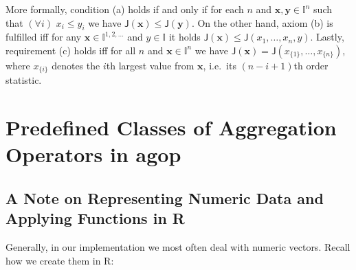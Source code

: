 \documentclass[11pt]{article}\usepackage{graphicx, color}
\newcommand{\package}[1]{\textsf{#1}\xspace}
\newcommand{\lang}[1]{\textsf{#1}\xspace}
\newcommand{\R}{\lang{R}}
\newcommand{\vect}[1]{{\mathbf{#1}}}
\newcommand{\func}[1]{{\mathsf{#1}}}
\newcommand{\Ival}{\mathbb{I}}
\newcommand{\IvalPow}[1]{\mathbb{I}^{#1}}
\newcommand{\AnyPow}{^{1,2,\dots}}
\newcommand{\IvalAnyPow}{\mathbb{I}\AnyPow}
\theoremstyle{remark}
\theoremstyle{definition}
\begin{document}
More formally, condition (a) holds if and only if for each
$n$ and $\vect{x},\vect{y}\in\IvalPow{n}$ such that $(\forall i)$
$x_i\le y_i$ we have $\func{J}(\vect{x})\le\func{J}(\vect{y})$.
On the other hand, axiom (b) is fulfilled iff
for any $\vect{x}\in\IvalAnyPow$ and $y\in\Ival$ it holds
$\func{J}(\vect{x})\le\func{J}(x_1,\dots,x_n,y)$.
Lastly, requirement (c) holds iff for all $n$ and $\vect{x}\in\IvalPow{n}$
we have $\func{J}(\vect{x})=\func{J}(x_{\{1\}},\dots,x_{\{n\}})$,
where $x_{\{i\}}$ denotes the $i$th largest value from $\vect{x}$,
i.e.~its $(n-i+1)$th order statistic.








\section{Predefined Classes of Aggregation Operators in \package{agop}}


\subsection{A Note on Representing Numeric Data and Applying Functions in \R}
Generally, in our implementation we most often deal with numeric vectors.
Recall how we create them in \R:
\end{document}
